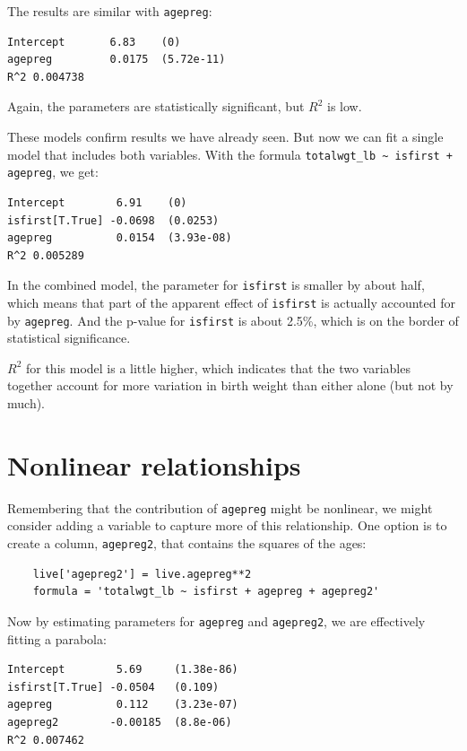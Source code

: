 \documentclass[12pt]{book}
\begin{document}
The results are similar with {\tt agepreg}:

\begin{verbatim}
Intercept       6.83    (0)
agepreg         0.0175  (5.72e-11)
R^2 0.004738
\end{verbatim}

Again, the parameters are statistically significant, but
$R^2$ is low.

These models confirm results we have already seen.  But now we
can fit a single model that includes both variables.  With the
formula \verb"totalwgt_lb ~ isfirst + agepreg", we get:

\begin{verbatim}
Intercept        6.91    (0)
isfirst[T.True] -0.0698  (0.0253)
agepreg          0.0154  (3.93e-08)
R^2 0.005289
\end{verbatim}

In the combined model, the parameter for {\tt isfirst} is smaller
by about half, which means that part of the apparent effect of
{\tt isfirst} is actually accounted for by {\tt agepreg}.  And
the p-value for {\tt isfirst} is about 2.5\%, which is on the
border of statistical significance.

$R^2$ for this model is a little higher, which indicates that the
two variables together account for more variation in birth weight
than either alone (but not by much).


\section{Nonlinear relationships}
\label{nonlinear}

Remembering that the contribution of {\tt agepreg} might be nonlinear,
we might consider adding a variable to capture more of this
relationship.  One option is to create a column, {\tt agepreg2},
that contains the squares of the ages:

\begin{verbatim}
    live['agepreg2'] = live.agepreg**2
    formula = 'totalwgt_lb ~ isfirst + agepreg + agepreg2'
\end{verbatim}

Now by estimating parameters for {\tt agepreg} and {\tt agepreg2},
we are effectively fitting a parabola:

\begin{verbatim}
Intercept        5.69     (1.38e-86)
isfirst[T.True] -0.0504   (0.109)
agepreg          0.112    (3.23e-07)
agepreg2        -0.00185  (8.8e-06)
R^2 0.007462
\end{verbatim}
\end{document}
